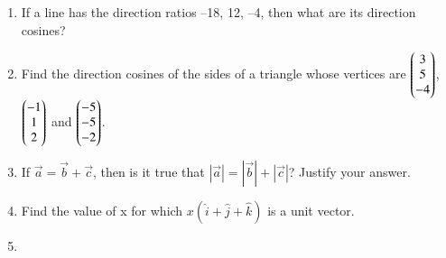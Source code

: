 \begin{enumerate}[label=\thesection.\arabic*,ref=\thesection.\theenumi]
	\\
\solution
		
\item If a line has the direction ratios –18, 12, –4, then what are its direction cosines?
		\\
		\solution
		
	\item Find the direction cosines of the sides of a triangle whose vertices are $\begin{pmatrix}3\\ 5\\-4 \end{pmatrix}$, $\begin{pmatrix} -1\\1 \\2 \end{pmatrix}$ and $\begin{pmatrix}-5 \\-5 \\-2 \end{pmatrix}$.
		\\
		\solution
		
\item If $\vec{a}=\vec{b}+\vec{c}$, then is it true that $|\vec{a}|=|\vec{b}|+|\vec{c}|$? Justify your answer.\\
	\solution
		
\item Find the value of x for which $x(\hat{i}+\hat{j}+\hat{k})$ is a unit vector.\\
	\solution
		
	\item 
		

\end{enumerate}
